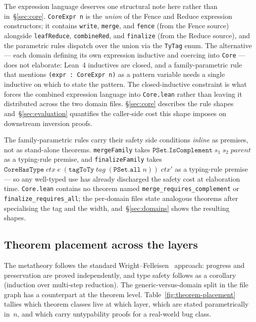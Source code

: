 \documentclass[acmsmall,screen,review,anonymous,nonacm]{acmart}
\newcommand{\CoreHasType}{\texttt{CoreHasType}}
\newcommand{\TyTag}{\texttt{TyTag}}
\begin{document}
The expression language deserves one structural note here rather than in~\S\ref{sec:core}. \texttt{CoreExpr n} is the \emph{union} of the Fence and Reduce expression constructors; it contains \texttt{write}, \texttt{merge}, and \texttt{fence} (from the Fence source) alongside \texttt{leafReduce}, \texttt{combineRed}, and \texttt{finalize} (from the Reduce source), and the parametric rules dispatch over the union via the \TyTag{} enum. The alternative --- each domain defining its own expression inductive and coercing into \texttt{Core} --- does not elaborate: Lean~4 inductives are closed, and a family-parametric rule that mentions \texttt{(expr : CoreExpr n)} as a pattern variable needs a single inductive on which to state the pattern. The closed-inductive constraint is what forces the combined expression language into \texttt{Core.lean} rather than leaving it distributed across the two domain files. \S\ref{sec:core} describes the rule shapes and~\S\ref{sec:evaluation} quantifies the caller-side cost this shape imposes on downstream inversion proofs.

The family-parametric rules carry their safety side conditions \emph{inline} as premises, not as stand-alone theorems. \texttt{mergeFamily} takes $\texttt{PSet.IsComplement}\;s_1\;s_2\;\mathit{parent}$ as a typing-rule premise, and \texttt{finalizeFamily} takes $\CoreHasType\;\mathit{ctx}\;e\;(\texttt{tagToTy}\;\mathit{tag}\;(\texttt{PSet.all}\;n))\;\mathit{ctx'}$ as a typing-rule premise --- so any well-typed use has already discharged the safety cost at elaboration time. \texttt{Core.lean} contains no theorem named \texttt{merge\_requires\_complement} or \texttt{finalize\_requires\_all}; the per-domain files state analogous theorems after specialising the tag and the width, and~\S\ref{sec:domains} shows the resulting shapes.

\subsection{Theorem placement across the layers}\label{sec:theorem-placement}

The metatheory follows the standard Wright--Felleisen~\cite{wright:ic:1994} approach: progress and preservation are proved independently, and type safety follows as a corollary (induction over multi-step reduction). The generic-versus-domain split in the file graph has a counterpart at the theorem level. Table~\ref{fig:theorem-placement} tallies which theorem classes live at which layer, which are stated parametrically in~$n$, and which carry untypability proofs for a real-world bug class.
\end{document}
